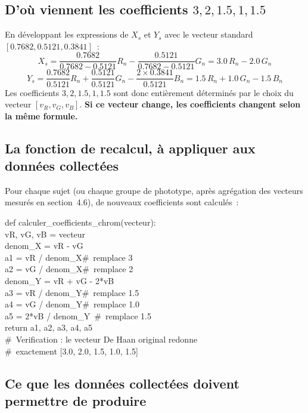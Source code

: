 \documentclass[11pt,a4paper]{article}
\begin{document}
\subsection{D'o\`u viennent les coefficients $3, 2, 1.5, 1, 1.5$}

En d\'eveloppant les expressions de $X_s$ et $Y_s$ avec le vecteur standard
$[0.7682, 0.5121, 0.3841]$~:
\[
X_s = \frac{0.7682}{0.7682-0.5121}R_n - \frac{0.5121}{0.7682-0.5121}G_n
    = 3.0\,R_n - 2.0\,G_n
\]
\[
Y_s = \frac{0.7682}{0.5121}R_n + \frac{0.5121}{0.5121}G_n -
\frac{2\times0.3841}{0.5121}B_n
    = 1.5\,R_n + 1.0\,G_n - 1.5\,B_n
\]
Les coefficients $3, 2, 1.5, 1, 1.5$ sont donc enti\`erement d\'etermin\'es
par le choix du vecteur $[v_R, v_G, v_B]$. \textbf{Si ce vecteur change, les
coefficients changent selon la m\^eme formule.}

\subsection{La fonction de recalcul, \`a appliquer aux donn\'ees
collect\'ees}

Pour chaque sujet (ou chaque groupe de phototype, apr\`es agr\'egation des
vecteurs mesur\'es en section~4.6), de nouveaux coefficients sont
calcul\'es~:

\begin{codebox}
def calculer\_coefficients\_chrom(vecteur):\\
\quad vR, vG, vB = vecteur\\[4pt]
\quad denom\_X = vR - vG\\
\quad a1 = vR / denom\_X\quad\#\ remplace 3\\
\quad a2 = vG / denom\_X\quad\#\ remplace 2\\[4pt]
\quad denom\_Y = vR + vG - 2*vB\\
\quad a3 = vR / denom\_Y\quad\#\ remplace 1.5\\
\quad a4 = vG / denom\_Y\quad\#\ remplace 1.0\\
\quad a5 = 2*vB / denom\_Y\ \#\ remplace 1.5\\[4pt]
\quad return a1, a2, a3, a4, a5\\[6pt]
\#\ Verification : le vecteur De Haan original redonne\\
\#\ exactement [3.0, 2.0, 1.5, 1.0, 1.5]
\end{codebox}

\subsection{Ce que les donn\'ees collect\'ees doivent permettre de
produire}
\end{document}
